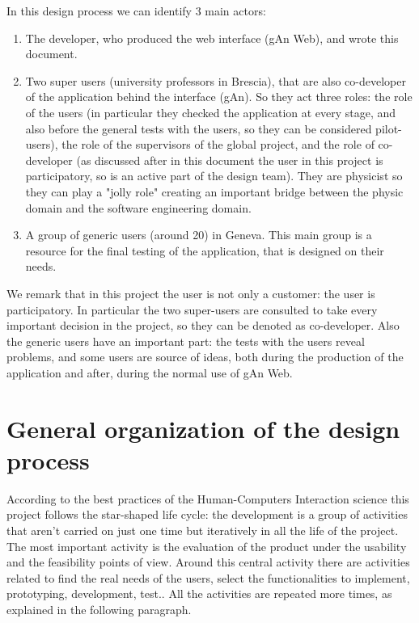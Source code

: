 In this design process we can identify 3 main actors: 
\begin{enumerate}

\item
The developer, who produced the web interface (gAn Web), and wrote this document.

\item 
Two super users (university professors in Brescia), that are also co-developer of the application behind the interface (gAn). So they act three roles: the role of the users (in particular they checked the application at every stage, and also before the general tests with the users, so they can be considered pilot-users), the role of the supervisors of the global project, and the role of co-developer (as discussed after in this document the user in this project is participatory, so is an active part of the design team). 
They are physicist so they can play a "jolly role" creating an important bridge between the physic domain and the software engineering domain. 

\item A group of generic users (around 20) in Geneva. This main group is a resource for the final testing of the application, that is designed on their needs.
 
\end{enumerate}

We remark that in this project the user is not only a customer: the user is participatory. In particular the two super-users are consulted to take every important decision in the project, so they can be denoted as co-developer. Also the generic users have an important part: the tests with the users reveal problems, and some users are source of ideas, both during the production of the application and after, during the normal use of gAn Web.

\section{General organization of the design process }
According to the best practices of the Human-Computers Interaction science this project follows the star-shaped life cycle: the development is a group of activities that aren't carried on just one time but iteratively in all the life of the project. The most important activity is the evaluation of the product under the usability and the feasibility points of view. Around this central activity there are activities related to find the real needs of the users, select the functionalities to implement, prototyping, development, test.. All the activities are repeated more times, as explained in the following paragraph.    

